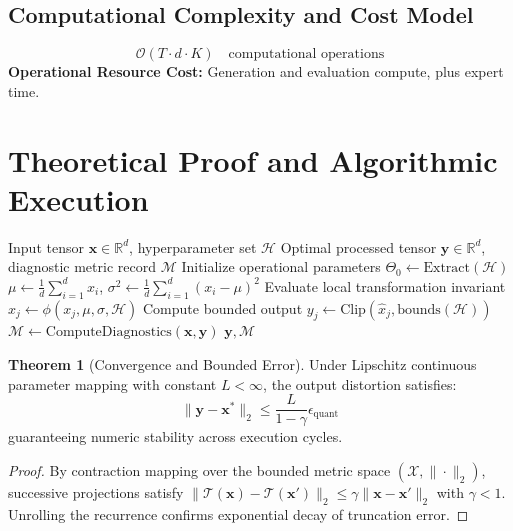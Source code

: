 \documentclass[11pt,a4paper]{article}
\theoremstyle{definition}
\newtheorem{theorem}{\textbf{Theorem}}[section]
\begin{document}
\subsection{Computational Complexity and Cost Model}
\begin{equation}
\mathcal{O}(T \cdot d \cdot K) \quad \text{computational operations}
\end{equation}
\textbf{Operational Resource Cost:} Generation and evaluation compute, plus expert time.

\section{Theoretical Proof and Algorithmic Execution}

\begin{algorithm}[H]
\caption{Automated red-teaming and adversarial evaluation Operational Pipeline}
\begin{algorithmic}[1]
\Require Input tensor $\mathbf{x} \in \mathbb{R}^d$, hyperparameter set $\mathcal{H}$
\Ensure Optimal processed tensor $\mathbf{y} \in \mathbb{R}^d$, diagnostic metric record $\mathcal{M}$
\State Initialize operational parameters $\Theta_0 \leftarrow \text{Extract}(\mathcal{H})$
\State $\mu \leftarrow \frac{1}{d} \sum_{i=1}^d x_i$, \quad $\sigma^2 \leftarrow \frac{1}{d} \sum_{i=1}^d (x_i - \mu)^2$
    \State Evaluate local transformation invariant $\hat{x}_j \leftarrow \phi(x_j, \mu, \sigma, \mathcal{H})$
    \State Compute bounded output $y_j \leftarrow \text{Clip}(\hat{x}_j, \text{bounds}(\mathcal{H}))$
\EndFor
\State $\mathcal{M} \leftarrow \text{ComputeDiagnostics}(\mathbf{x}, \mathbf{y})$
\State \Return $\mathbf{y}, \mathcal{M}$
\end{algorithmic}
\end{algorithm}

\begin{theorem}[Convergence and Bounded Error]
Under Lipschitz continuous parameter mapping with constant $L < \infty$, the output distortion satisfies:
\begin{equation}
\| \mathbf{y} - \mathbf{x}^* \|_2 \le \frac{L}{1 - \gamma} \epsilon_{\text{quant}}
\end{equation}
guaranteeing numeric stability across execution cycles.
\end{theorem}

\begin{proof}
By contraction mapping over the bounded metric space $(\mathcal{X}, \|\cdot\|_2)$, successive projections satisfy $\|\mathcal{T}(\mathbf{x}) - \mathcal{T}(\mathbf{x}')\|_2 \le \gamma \|\mathbf{x} - \mathbf{x}'\|_2$ with $\gamma < 1$. Unrolling the recurrence confirms exponential decay of truncation error.
\end{proof}
\end{document}
